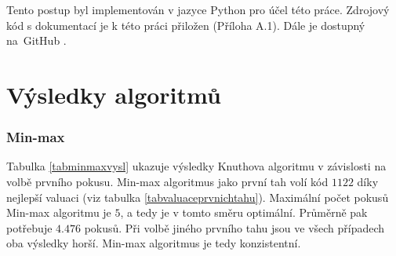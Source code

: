 Tento postup byl implementován v jazyce Python pro účel této práce. Zdrojový kód s dokumentací je k této práci přiložen (Příloha A.1). Dále je dostupný na~GitHub \cite{Simsa_Strategies_for_Mastermind_2025}. 





\section{Výsledky algoritmů}

\subsubsection{Min-max}

Tabulka \ref{tabminmaxvysl} ukazuje výsledky Knuthova algoritmu v závislosti na volbě prvního pokusu. Min-max algoritmus jako první tah volí kód $1122$ díky nejlepší valuaci (viz tabulka \ref{tabvaluaceprvnichtahu}). Maximální počet pokusů Min-max algoritmu je $5$, a tedy je v tomto směru optimální. Průměrně pak potřebuje $4.476$ pokusů. Při volbě jiného prvního tahu jsou ve všech případech oba výsledky horší. Min-max algoritmus je tedy konzistentní.

